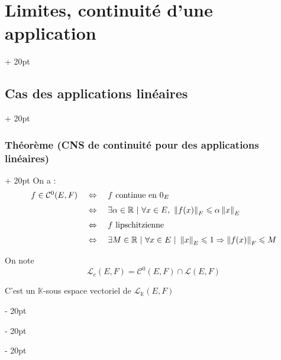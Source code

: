 \documentclass[a4paper, 12pt, twoside]{article}
\newcommand{\R}{\mathbb{R}} %
\newcommand{\K}{\mathbb K}
\newcommand{\norm}[1]{\left\lVert #1 \right\rVert}
\newcommand{\ssi}{\ \Leftrightarrow \ }
\renewcommand{\le}{\leqslant}
\newcommand{\ind}[1][20pt]{\advance\leftskip + #1}
\newcommand{\deind}[1][20pt]{\advance\leftskip - #1}
\newenvironment{indt}[2][20pt]{#2 \par \ind[#1]}{\par \deind} %
\begin{document}
\begin{indt}{\section{Limites, continuité d'une application}}
\begin{indt}{\subsection{Cas des applications linéaires}}
\begin{indt}{\subsubsection{Théorème (CNS de continuité pour des applications linéaires)}}
                On a :
                \[
                    \begin{array}{rcl}
                        f \in \mathcal C^0(E, F)
                        &\ssi&
                        f\ \text{continue en}\ 0_E
                        \vspace{6pt}
                        \\
                        &\ssi&
                        \exists \alpha \in \R\ |\ \forall x \in E,\ \norm{f(x)}_F \le \alpha \norm x _E
                        \vspace{6pt}
                        \\
                        &\ssi&
                        f\ \text{lipschitzienne}
                        \vspace{6pt}
                        \\
                        &\ssi&
                        \exists M \in \R\ |\ \forall x \in E\ |\
                        \norm x _E \le 1 \Rightarrow \norm{f(x)}_F \le M
                    \end{array}
                \]

                \vspace{12pt}
                
                On note
                \[
                    \mathcal L_c(E, F) = \mathcal C^0(E, F) \cap \mathcal L(E, F)
                \]

                C'est un $\K$-sous espace vectoriel de $\mathcal L_\K(E, F)$
            \end{indt}

            \vspace{12pt}
            

\end{indt}
\end{indt}
\end{document}
